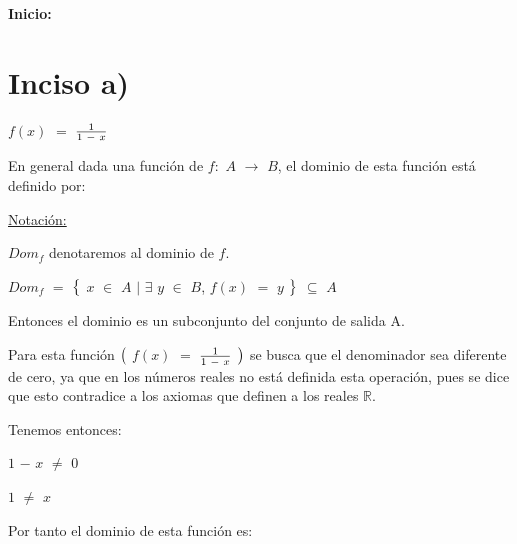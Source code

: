 \documentclass[12pt]{article}
\newenvironment{MyColorPar}[1]{%
    \leavevmode\color{#1}\ignorespaces%
}{%
}%
\begin{document}
{\textcolor{Cinnabar}{\bfseries{Inicio:}}} \vspace{0.5cm}

\section*{{\textcolor{Lochinvar}{\textsf{\bfseries{Inciso a)}}}}} \begin{MyColorPar}{Lochinvar} 
    $f(x)$ $=$ \LARGE{$\frac{1}{1 \hspace{0.1cm} - \hspace{0.1cm} x }$}
    \end{MyColorPar} \vspace{0.5cm}
    
\begin{MyColorPar}{Lochinvar} \bfseries{
{} En general dada una función de $f:$ $A$ $\longrightarrow$ $B$, el dominio de esta función está definido por: \vspace{0.5cm}

{\underline{Notación:}}} $Dom_{f}$ denotaremos al dominio de $f.$ \vspace{0.5cm}

\hspace{4cm} $Dom_{f}$ $=$ $\big{\{}$ $x$ $\in$ $A$ $\mid$ $\exists$ $y$ $\in$ $B$, $f(x)$ $=$ $y$ $\big{\}}$  $\subseteq$ $A$ \vspace{0.5cm}

Entonces el dominio es un subconjunto del conjunto de salida A. \vspace{0.5cm}

Para esta función $\big{(}$ $f(x)$ $=$ {\LARGE{$\frac{1}{1 \hspace{0.1cm} - \hspace{0.1cm} x}$}} $\big{)}$  se busca que el denominador sea diferente de cero, ya que en los números reales no está definida esta operación, pues se dice que esto contradice a los axiomas que definen a los reales $\mathbb{R}$. \vspace{0.5cm}

Tenemos entonces: \vspace{0.5cm}

\hspace{4cm} $1$ $-$ $x$ $\neq$ $0$

\hspace{4cm} $1$ $\neq$ $x$ \vspace{0.5cm}

Por tanto el dominio de esta función es: \vspace{0.5cm}


\end{MyColorPar}
\end{document}
